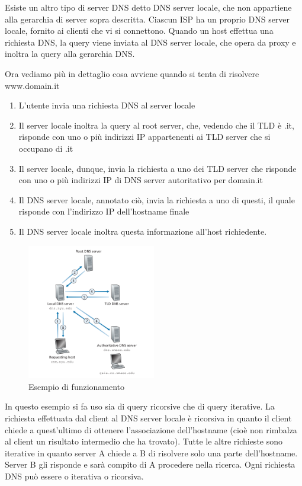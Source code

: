 \documentclass{book}
\begin{document}
Esiste un altro tipo di server DNS detto DNS server locale, che non appartiene alla gerarchia di server sopra descritta. Ciascun ISP ha un proprio DNS server locale, fornito ai clienti che vi si connettono. Quando un host effettua una richiesta DNS, la query viene inviata al DNS server locale, che opera da proxy e inoltra la query alla gerarchia DNS.

Ora vediamo più in dettaglio cosa avviene quando si tenta di risolvere www.domain.it
\begin{enumerate}
	\item L'utente invia una richiesta DNS al server locale
	\item Il server locale inoltra la query al root server, che, vedendo che il TLD è .it, risponde con uno o più indirizzi IP appartenenti ai TLD server che si occupano di .it
	\item Il server locale, dunque, invia la richiesta a uno dei TLD server che risponde con uno o più indirizzi IP di DNS server autoritativo per domain.it
	\item Il DNS server locale, annotato ciò, invia la richiesta a uno di questi, il quale risponde con l'indirizzo IP dell'hostname finale
	\item Il DNS server locale inoltra questa informazione all'host richiedente.
\end{enumerate}

\begin{figure}[h]
	\centering
	\includegraphics[width=0.5\textwidth]{images/dns_query_example.png}
	\caption{Esempio di funzionamento}
	\label{fig:esempio}
\end{figure}


In questo esempio si fa uso sia di query ricorsive che di query iterative. La richiesta effettuata dal client al DNS server locale è ricorsiva in quanto il client chiede a quest'ultimo di ottenere l'associazione dell'hostname (cioè non rimbalza al client un risultato intermedio che ha trovato). Tutte le altre richieste sono iterative in quanto server A chiede a B di risolvere solo una parte dell'hostname. Server B gli risponde e sarà compito di A procedere nella ricerca. Ogni richiesta DNS può essere o iterativa o ricorsiva.
\end{document}
